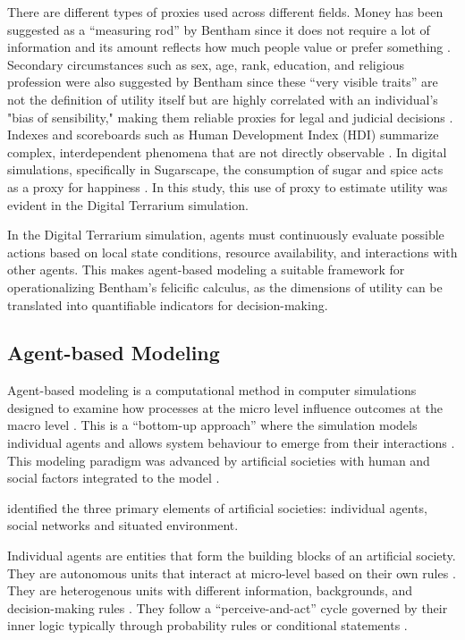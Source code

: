 \documentclass{icsthesis}
\begin{document}
\begin{mainmatter}
There are different types of proxies used across different fields. Money has been suggested as a “measuring rod” by Bentham since it does not require a lot of information and its amount reflects how much people value or prefer something \citep{Baujard2006}. Secondary circumstances such as sex, age, rank, education, and religious profession were also suggested by Bentham since these “very visible traits” are not the definition of utility itself but are highly correlated with an individual's "bias of sensibility," making them reliable proxies for legal and judicial decisions \citep{Baujard2009}. Indexes and scoreboards such as Human Development Index (HDI) summarize complex, interdependent phenomena that are not directly observable \citep{Munda2020}. In digital simulations, specifically in Sugarscape, the consumption of sugar and spice acts as a proxy for happiness \citep{KremerHerman2024b}. In this study, this use of proxy to estimate utility was evident in the Digital Terrarium simulation. 

In the Digital Terrarium simulation, agents must continuously evaluate possible actions based on local state conditions, resource availability, and interactions with other agents. This makes agent-based modeling a suitable framework for operationalizing Bentham’s felicific calculus, as the dimensions of utility can be translated into quantifiable indicators for decision-making.

			\subsection{Agent-based Modeling}
Agent-based modeling is a computational method in computer simulations designed to examine how processes at the micro level influence outcomes at the macro level \citep{Scalco2015}. This is a “bottom-up approach” where the simulation models individual agents and allows system behaviour to emerge from their interactions \citep{Kehoe2015}. This modeling paradigm was advanced by artificial societies with human and social factors integrated to the model \citep{Tolk2022}.

\citet{Tolk2022} identified the three primary elements of artificial societies: individual agents, social networks and situated environment.

Individual agents are entities that form the building blocks of an artificial society. They are autonomous units that interact at micro-level based on their own rules \citep{KremerHerman2024b}. They are heterogenous units with different information, backgrounds, and decision-making rules \citep{Lempert2002}. They follow a “perceive-and-act” cycle governed by their inner logic typically through probability rules or conditional statements \citep{Tolk2022}.


\end{mainmatter}
\end{document}
